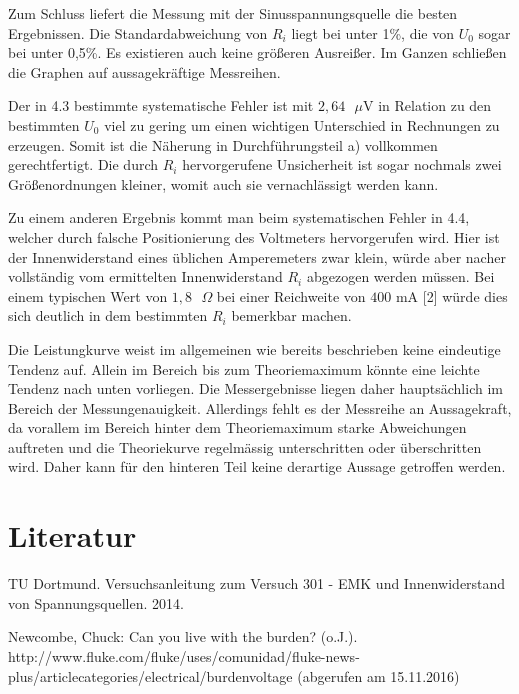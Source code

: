 Zum Schluss liefert die Messung mit der Sinusspannungsquelle die besten Ergebnissen.
Die Standardabweichung von $R_i$ liegt bei unter 1\%, die von $U_0$ sogar bei unter 0,5\%.
 Es existieren auch keine größeren Ausreißer.
 Im Ganzen schließen die Graphen auf aussagekräftige Messreihen.

Der in 4.3 bestimmte systematische Fehler ist mit $2,64\text{ }\mu$V in Relation zu den bestimmten $U_0$ viel zu gering
um einen wichtigen Unterschied in Rechnungen zu erzeugen. Somit ist die Näherung in Durchführungsteil a)
 vollkommen gerechtfertigt. Die durch $R_i$ hervorgerufene Unsicherheit ist sogar nochmals
 zwei Größenordnungen kleiner, womit auch sie vernachlässigt werden kann.

 Zu einem anderen Ergebnis kommt man beim systematischen Fehler in 4.4, welcher durch falsche Positionierung des Voltmeters hervorgerufen wird.
Hier ist der Innenwiderstand eines üblichen Amperemeters zwar klein, würde aber nacher vollständig vom ermittelten Innenwiderstand $R_i$ abgezogen werden müssen. Bei einem typischen Wert von $1,8\text{ }\Omega$ bei einer Reichweite von $400$ mA [2] würde dies sich deutlich in dem bestimmten $R_i$ bemerkbar machen.

Die Leistungkurve weist im allgemeinen wie bereits beschrieben keine eindeutige Tendenz auf. Allein im Bereich bis zum Theoriemaximum
könnte eine leichte Tendenz nach unten vorliegen. Die Messergebnisse liegen daher hauptsächlich
 im Bereich der Messungenauigkeit. Allerdings fehlt es der Messreihe an Aussagekraft, da vorallem im Bereich
  hinter dem Theoriemaximum starke Abweichungen auftreten und die Theoriekurve regelmässig
  unterschritten oder überschritten wird. Daher kann für den hinteren Teil keine derartige Aussage getroffen werden.

\section{Literatur}
\begin{enumerate}[{[}1{]}]
	\item TU Dortmund. Versuchsanleitung zum Versuch 301 - EMK und Innenwiderstand von Spannungsquellen. 2014.
	
	\item Newcombe, Chuck: Can you live with the burden? (o.J.).\\ http://www.fluke.com/fluke/uses/comunidad/fluke-news-plus/articlecategories/electrical/burdenvoltage (abgerufen am 15.11.2016)
\end{enumerate}



